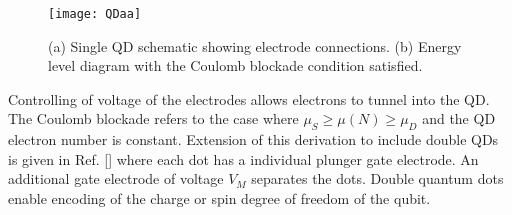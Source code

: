 \begin{figure}[t]
\centering
\texttt{[image: QDaa]}
\caption{\label{fig:QDaa}(a) Single QD schematic showing electrode connections. (b) Energy level diagram with the Coulomb blockade condition satisfied.}
\end{figure} 

Controlling of voltage of the electrodes allows electrons to tunnel into the QD. The Coulomb blockade refers to the case where $\mu_{S} \geq \mu(N) \geq \mu_{D}$ and the QD electron number is constant. Extension of this derivation to include double QDs is given in Ref. [] where each dot has a individual plunger gate electrode. An additional gate electrode of voltage $V_{M}$ separates the dots. Double quantum dots enable encoding of the charge or spin degree of freedom of the qubit. 
  

  


